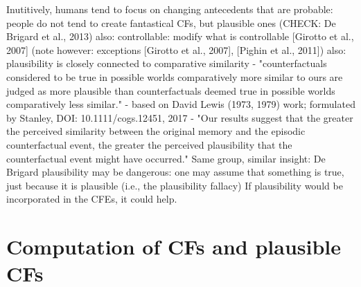 {}\textcolor{ACMDarkBlue}{
Inutitively, humans tend to focus on changing antecedents that are probable: people do not tend to create fantastical CFs, but plausible ones (CHECK: De Brigard et al., 2013)
also: controllable: modify what is controllable [Girotto et al., 2007] (note however: exceptions [Girotto et al., 2007], [Pighin et al., 2011])
}\textcolor{ACMDarkBlue}{
also: 
plausibility is closely connected to comparative similarity - "counterfactuals considered to be true in possible worlds comparatively more similar to ours are judged as more plausible than counterfactuals deemed true in possible worlds comparatively less similar." - based on David Lewis (1973, 1979) work; formulated by Stanley, DOI: 10.1111/cogs.12451, 2017 - "Our results suggest that the greater the perceived similarity between the original memory and the episodic counterfactual event, the greater the perceived plausibility that the counterfactual event might have occurred."
Same group, similar insight: De Brigard
}\textcolor{ACMDarkBlue}{
% 
plausibility may be dangerous: one may assume that something is true, just because it is plausible (i.e., the plausibility fallacy)
}\textcolor{ACMDarkBlue}{
If plausibility would be incorporated in the CFEs, it could help.
}

\section{Computation of CFs and plausible CFs}\label{sec:EffCompCFs}

\textcolor{ACMDarkBlue}{}

